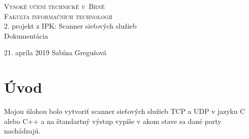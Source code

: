 \documentclass[11pt, a4paper]{article}
\begin{document}
\begin{titlepage}
\begin{center}
\Huge
\textsc{Vysoké učení technické v~Brně}\\
\huge
\textsc{Fakulta informačních technologií}\\
\LARGE 2. projekt z IPK: Scanner sieťových služieb\\
\Huge Dokumentácia
\end{center}
{\Large 21. apríla 2019 \hfill
Sabína Gregušová}
\end{titlepage}

\tableofcontents
\clearpage

\section{Úvod}
Mojou úlohou bolo vytvoriť scanner sieťových služieb TCP a UDP v jazyku C alebo C++ a na štandartný výstup vypíše v akom stave sa dané porty nachádzajú.
\end{document}
